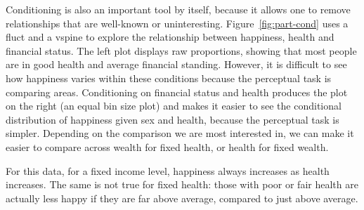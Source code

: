 \documentclass[journal]{vgtc}
\begin{document}
Conditioning is also an important tool by itself, because it allows one to remove relationships that are well-known or uninteresting. Figure~\ref{fig:part-cond} uses a fluct and a vspine to explore the relationship between happiness, health and financial status. The left plot displays raw proportions, showing that most people are in good health and average financial standing. However, it is difficult to see how happiness varies within these conditions because the perceptual task is comparing areas. Conditioning on financial status and health produces the plot on the right (an equal bin size plot) and makes it easier to see the conditional distribution of happiness given sex and health, because the perceptual task is simpler.  Depending on the comparison we are most interested in, we can make it easier to compare across wealth for fixed health, or health for fixed wealth. 

For this data, for a fixed income level, happiness always increases as health increases. The same is not true for fixed health: those with poor or fair health are actually less happy if they are far above average, compared to just above average.
\end{document}
